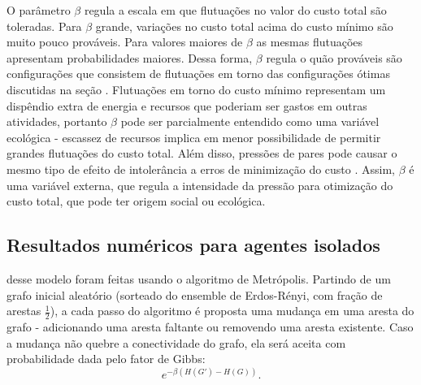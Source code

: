 O parâmetro $\beta$ regula a escala em que flutuações no valor do custo total são toleradas. Para $\beta$ grande, variações no custo total acima do custo mínimo são muito pouco prováveis. Para valores maiores de $\beta$ as mesmas flutuações apresentam probabilidades maiores. Dessa forma, $\beta$ regula o quão prováveis são configurações que consistem de flutuações em torno das configurações ótimas discutidas na seção \emph{}. Flutuações em torno do custo mínimo representam um dispêndio extra de energia e recursos que poderiam ser gastos em outras atividades, portanto $\beta$ pode ser parcialmente entendido como uma variável ecológica - escassez de recursos implica em menor possibilidade de permitir grandes flutuações do custo total. Além disso, pressões de pares pode causar o mesmo tipo de efeito de intolerância a erros de minimização do custo \sourcesneeded. Assim, $\beta$ é uma variável externa, que regula a intensidade da pressão para otimização do custo total, que pode ter origem social ou ecológica. 

\subsection{Resultados numéricos para agentes isolados}
 desse modelo foram feitas usando o algoritmo de Metrópolis. Partindo de um grafo inicial aleatório (sorteado do ensemble de Erdos-Rényi, com fração de arestas $\frac{1}{2}$), a cada passo do algoritmo é proposta uma mudança em uma aresta do grafo - adicionando uma aresta faltante ou removendo uma aresta existente. Caso a mudança não quebre a conectividade do grafo, ela será aceita com probabilidade dada pelo fator de Gibbs: 
\begin{equation}
\label{eq:gibbsfactor}
e^{-\beta \left(H(G') - H(G)\right)}.
\end{equation}

